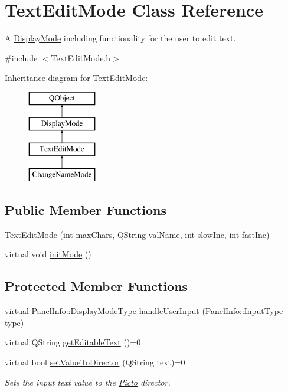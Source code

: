 \hypertarget{class_text_edit_mode}{\section{Text\-Edit\-Mode Class Reference}
\label{class_text_edit_mode}
}


A \hyperlink{class_display_mode}{Display\-Mode} including functionality for the user to edit text.  




{\ttfamily \#include $<$Text\-Edit\-Mode.\-h$>$}

Inheritance diagram for Text\-Edit\-Mode\-:\begin{figure}[H]
\begin{center}
\leavevmode
\includegraphics[height=4.000000cm]{class_text_edit_mode}
\end{center}
\end{figure}
\subsection*{Public Member Functions}
\begin{DoxyCompactItemize}
\item 
\hyperlink{class_text_edit_mode_aefc260f73e2d9243e62a4e265fc6daa9}{Text\-Edit\-Mode} (int max\-Chars, Q\-String val\-Name, int slow\-Inc, int fast\-Inc)
\item 
virtual void \hyperlink{class_text_edit_mode_abad4ebd912fec7f1e592a2d4596064c0}{init\-Mode} ()
\end{DoxyCompactItemize}
\subsection*{Protected Member Functions}
\begin{DoxyCompactItemize}
\item 
virtual \hyperlink{namespace_panel_info_adb8b98e092c15e831aa524d39701d565}{Panel\-Info\-::\-Display\-Mode\-Type} \hyperlink{class_text_edit_mode_a9994ab201fb29cc3ac383b3bbea25ec7}{handle\-User\-Input} (\hyperlink{namespace_panel_info_aeeb3b627166cd15c3898f93a1a499c65}{Panel\-Info\-::\-Input\-Type} type)
\item 
virtual Q\-String \hyperlink{class_text_edit_mode_a3230fa49040fb5e79fadafad94f035f7}{get\-Editable\-Text} ()=0
\item 
virtual bool \hyperlink{class_text_edit_mode_a098ed6941771eb88d9d9d02ef16c7cfd}{set\-Value\-To\-Director} (Q\-String text)=0
\begin{DoxyCompactList}\small\item\em Sets the input text value to the \hyperlink{namespace_picto}{Picto} director. \end{DoxyCompactList}\end{DoxyCompactItemize}
